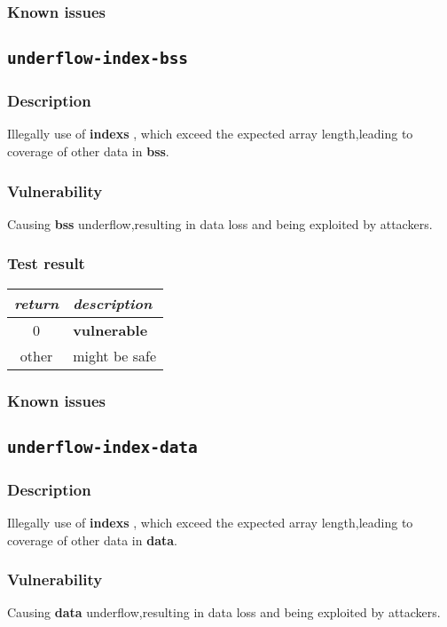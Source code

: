 \documentclass[a4paper]{book}
\begin{document}
\subsubsection{Known issues}
\newpage

\subsection{\texttt{underflow-index-bss}}\label{test-underflow-index-bss}
\subsubsection{Description}
Illegally use of \textbf{indexs} , which exceed the expected array length,leading to coverage of other data in \textbf{bss}.\subsubsection{Vulnerability}
Causing \textbf{bss} underflow,resulting in data loss and being exploited by attackers.
\subsubsection{Test result}
\begin{tabular}{cl}
  \toprule
  \emph{return}  & \emph{description} \\
  \midrule
  0              & \textbf{vulnerable} \\
  other          & might be safe \\
  \bottomrule
\end{tabular}
\subsubsection{Known issues}

\newpage

\subsection{\texttt{underflow-index-data}}\label{test-underflow-index-data}
\subsubsection{Description}
Illegally use of \textbf{indexs} , which exceed the expected array length,leading to coverage of other data in \textbf{data}.\subsubsection{Vulnerability}
Causing \textbf{data} underflow,resulting in data loss and being exploited by attackers.
\end{document}
